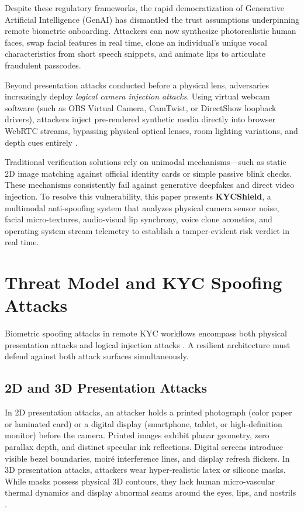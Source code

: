 \documentclass[conference]{IEEEtran}
\begin{document}
Despite these regulatory frameworks, the rapid democratization of Generative Artificial Intelligence (GenAI) has dismantled the trust assumptions underpinning remote biometric onboarding. Attackers can now synthesize photorealistic human faces, swap facial features in real time, clone an individual's unique vocal characteristics from short speech snippets, and animate lips to articulate fraudulent passcodes.

Beyond presentation attacks conducted before a physical lens, adversaries increasingly deploy \textit{logical camera injection attacks}. Using virtual webcam software (such as OBS Virtual Camera, CamTwist, or DirectShow loopback drivers), attackers inject pre-rendered synthetic media directly into browser WebRTC streams, bypassing physical optical lenses, room lighting variations, and depth cues entirely \cite{iso30107}.

Traditional verification solutions rely on unimodal mechanisms---such as static 2D image matching against official identity cards or simple passive blink checks. These mechanisms consistently fail against generative deepfakes and direct video injection. To resolve this vulnerability, this paper presents \textbf{KYCShield}, a multimodal anti-spoofing system that analyzes physical camera sensor noise, facial micro-textures, audio-visual lip synchrony, voice clone acoustics, and operating system stream telemetry to establish a tamper-evident risk verdict in real time.

\section{Threat Model and KYC Spoofing Attacks}
Biometric spoofing attacks in remote KYC workflows encompass both physical presentation attacks and logical injection attacks \cite{iso30107}. A resilient architecture must defend against both attack surfaces simultaneously.

\subsection{2D and 3D Presentation Attacks}
In 2D presentation attacks, an attacker holds a printed photograph (color paper or laminated card) or a digital display (smartphone, tablet, or high-definition monitor) before the camera. Printed images exhibit planar geometry, zero parallax depth, and distinct specular ink reflections. Digital screens introduce visible bezel boundaries, moir\'e interference lines, and display refresh flickers. In 3D presentation attacks, attackers wear hyper-realistic latex or silicone masks. While masks possess physical 3D contours, they lack human micro-vascular thermal dynamics and display abnormal seams around the eyes, lips, and nostrils \cite{iso30107}.
\end{document}
